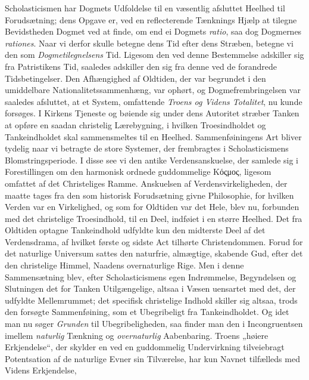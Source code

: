 \documentclass[12pt,a4paper]{book}
\newcommand{\opage}[1]{\marginnote{\footnotesize\textit{[#1]}}}
\begin{document}
\noindent Scholasticismen har Dogmets Udfoldelse til en væsentlig afsluttet
Heelhed til Forudsætning; dens Opgave er, ved en reflecterende Tænknings Hjælp at
tilegne Bevidstheden Dogmet ved at finde, om end ei Dogmets \textit{ratio}, saa dog Dogmernes \textit{rationes}. Naar vi derfor skulle betegne dens Tid efter dens Stræben,
betegne vi den som \emph{Dogmetilegnelsens} Tid. Ligesom den ved denne Bestemmelse
adskiller sig fra Patristikens Tid, saaledes adskiller den sig fra denne ved de
forandrede Tidsbetingelser. Den Afhængighed af Oldtiden, der var begrundet i den
umiddelbare Nationalitetssammenhæng, var ophørt, og Dogmefrembringelsen var
saaledes afsluttet, at et System, omfattende \emph{Troens og Videns Totalitet}, nu kunde
forsøges. I Kirkens Tjeneste og bøiende sig under dens Autoritet stræber Tanken at
opføre en saadan christelig Lærebygning, i hvilken Troesindholdet og
Tankeindholdet skal sammensmeltes til en Heelhed. Sammenføiningens Art bliver
tydelig naar vi betragte de store Systemer, der frembragtes i Scholasticismens
Blomstringsperiode. I disse see vi den antike Verdensanskuelse, der samlede sig i
Forestillingen om den harmonisk ordnede guddommelige Κόςμος, ligesom omfattet af
det Christeliges Ramme. Anskuelsen af Verdensvirkeligheden, der maatte tages fra
den som historisk Forudsætning givne Philosophie, for hvilken Verden var en
Virkelighed, og som for Oldtiden var det Hele, blev nu, forbunden med det
christelige Troesindhold, til en Deel, indføiet i en større \opage{19}Heelhed. Det fra
Oldtiden optagne Tankeindhold udfyldte kun den midterste Deel af det
Verdensdrama, af hvilket første og sidste Act tilhørte Christendommen. Forud for
det naturlige Universum sattes den naturfrie, almægtige, skabende Gud, efter det
den christelige Himmel, Naadens overnaturlige Rige. Men i denne Sammensætning
blev, efter Scholasticismens egen Indrømmelse, Begyndelsen og Slutningen det for Tanken Utilgængelige, altsaa i Væsen uensartet med det, der udfyldte
Mellemrummet; det specifisk christelige Indhold skiller sig altsaa, trods den
forsøgte Sammenføining, som et Ubegribeligt fra Tankeindholdet. Og idet man nu søger \emph{Grunden} til Ubegribeligheden, saa finder man den i Incongruentsen imellem \emph{naturlig} Tænkning og \emph{overnaturlig} Aabenbaring. Troens „høiere Erkjendelse“, der
skylder en ved en guddommelig Undervirkning tilveiebragt Potentsation af de
naturlige Evner sin Tilværelse, har kun Navnet tilfælleds med Videns Erkjendelse,
\end{document}
